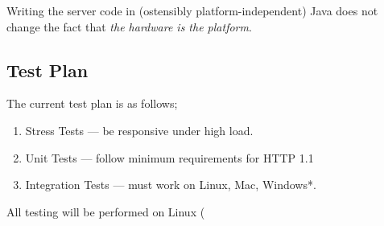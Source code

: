 Writing the server code in (ostensibly platform-independent) Java does not
change the fact that \emph{the hardware is the platform}\cite{mike-acton-three-big-lies}.


\subsection{Test Plan}
The current test plan is as follows;

\begin{enumerate}
  \item Stress Tests --- be responsive under high load.
  \item Unit Tests --- follow minimum requirements for HTTP 1.1
  \item Integration Tests --- must work on Linux, Mac, Windows*.
\end{enumerate}

All testing will be performed on Linux (
